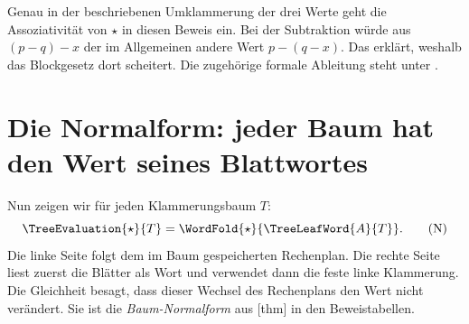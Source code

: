 Genau in der beschriebenen Umklammerung der drei Werte geht die
Assoziativität von \(\star\) in diesen Beweis ein. Bei der
Subtraktion würde aus \((p-q)-x\) der im Allgemeinen andere Wert
\(p-(q-x)\). Das erklärt, weshalb das Blockgesetz dort scheitert.
Die zugehörige formale Ableitung steht unter
.

\section*{Die Normalform: jeder Baum hat den Wert seines Blattwortes}
\hypertarget{bracketing.reading.normal}{}

Nun zeigen wir für jeden Klammerungsbaum \(T\):
\begin{equation}
  \TreeEvaluation{\star}{T}
    =\WordFold{\star}{\TreeLeafWord{A}{T}}.
  \tag{N}\label{bracketing-reading-normal}
\end{equation}
Die linke Seite folgt dem im Baum gespeicherten Rechenplan.
Die rechte Seite liest zuerst die Blätter als Wort und verwendet dann
die feste linke Klammerung. Die Gleichheit besagt, dass dieser Wechsel
des Rechenplans den Wert nicht verändert. Sie ist die
\emph{Baum-Normalform} aus
[thm] in den Beweistabellen.

